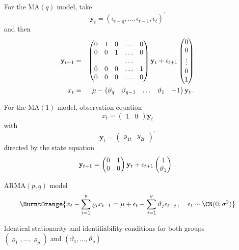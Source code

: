 \begin{slide}
For the MA$(q)$ model, take
\[
{\mathbf y}_t = ( \epsilon_{t-q},\ldots,
\epsilon_{t-1}, \allowbreak\epsilon_{t} )^\prime
\]
and then
\small\begin{eqnarray*}
{\mathbf y}_{t+1} &=& \left( \begin{matrix} 0 &1 &0 &\ldots &0\cr
				     0 &0 &1 &\ldots &0\cr
                                       &  &  &\ldots & \cr
				     0 &0 &0 &\ldots &1\cr
				     0 &0 &0 &\ldots &0\cr
		\end{matrix} \right) {\mathbf y}_t 
	+ \epsilon_{t+1} \left( \begin{matrix}
				0\cr 0\cr \vdots\cr 0\cr 1\cr
				\end{matrix} \right) \\
x_t &=& \mu - \left( \begin{matrix}\vartheta_q &\vartheta_{q-1} &\ldots
&\vartheta_1 &-1\end{matrix}\right) {\mathbf y}_t \,.
\end{eqnarray*}\normalsize

\end{slide}\begin{slide}

\debut
For the MA$(1)$ model, observation equation 
$$
  x_t = (\begin{matrix}1 &0\end{matrix}) {\mathbf y}_t
$$
with 
$$
  {\mathbf y}_t = (\begin{matrix}y_{1t} &y_{2t}\end{matrix})^\prime
$$
directed by the state equation
$$
  {\mathbf y}_{t+1} = \left( \begin{matrix} 0 &1\cr 0 &0\end{matrix}\right) {\mathbf y}_t
  + \epsilon_{t+1} \left( \begin{matrix} 1 \cr \vartheta_1\cr\end{matrix}\right)\,.
$$
\fin

\end{slide}\begin{slide}

ARMA$(p,q)$ model
\[\BurntOrange{
  x_t - \sum_{i=1}^p \varrho_i x_{t-1} = \mu +\epsilon_t 
  - \sum_{j=1}^q \vartheta_j \epsilon_{t-j}
  \,,\quad \epsilon_t\sim\CN(0,\sigma^2)
}\]

Identical stationarity and identifiability conditions for both groups\\
$(\varrho_1,\ldots,\varrho_p)$ and $(\vartheta_1,\ldots,\vartheta_q)$


\end{slide}

